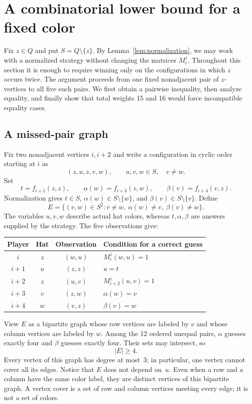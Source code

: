 \section{A combinatorial lower bound for a fixed color}\label{sec:local}
Fix $z\in Q$ and put $S=Q\setminus\{z\}$. By
Lemma~\ref{lem:normalization}, we may work with a normalized strategy
without changing the matrices $M_i^z$. Throughout this section it is enough
to require winning only on the configurations in which $z$ occurs twice.
The argument proceeds from one fixed nonadjacent pair of $z$-vertices
to all five such pairs. We first obtain a pairwise inequality, then
analyze equality, and finally show that total weights 15 and 16 would
force incompatible equality cases.

\subsection{A missed-pair graph}
Fix two nonadjacent vertices $i,i+2$ and write a configuration in cyclic
order starting at $i$ as
\begin{equation}\label{eq:two-z}
(z,u,z,v,w),\qquad u,v,w\in S,\quad v\ne w.
\end{equation}
Set
\[
t=f_{i+1}(z,z),\qquad
\alpha(w)=f_{i+3}(z,w),\qquad
\beta(v)=f_{i+4}(v,z).
\]
Normalization gives $t\in S$, $\alpha(w)\in S\setminus\{w\}$, and
$\beta(v)\in S\setminus\{v\}$. Define
\begin{equation}\label{eq:missed}
E=\{(v,w)\in S^2:v\ne w,\ \alpha(w)\ne v,\ \beta(v)\ne w\}.
\end{equation}
The variables $u,v,w$ describe actual hat colors, whereas $t,\alpha,\beta$
are answers supplied by the strategy. The five observations give:
\begin{center}\small
\begin{tabular}{@{}cccl@{}}
\toprule
Player&Hat&Observation&Condition for a correct guess\\
\midrule
$i$&$z$&$(w,u)$&$M_i^z(w,u)=1$\\
$i+1$&$u$&$(z,z)$&$u=t$\\
$i+2$&$z$&$(u,v)$&$M_{i+2}^z(u,v)=1$\\
$i+3$&$v$&$(z,w)$&$\alpha(w)=v$\\
$i+4$&$w$&$(v,z)$&$\beta(v)=w$\\
\bottomrule
\end{tabular}
\end{center}
View $E$ as a bipartite graph whose row vertices are labeled by $v$ and whose
column vertices are labeled by $w$. Among the 12 ordered unequal pairs,
$\alpha$ guesses exactly four and $\beta$ guesses exactly four. Their sets
may intersect, so
\begin{equation}\label{eq:missed-size}
|E|\geq4.
\end{equation}
Every vertex of this graph has degree at most~3; in particular, one vertex
cannot cover all its edges. Notice that $E$ does not depend on~$u$.
Even when a row and a column have the same color label, they are distinct
vertices of this bipartite graph. A vertex cover is a set of row and
column vertices meeting every edge; it is not a set of colors.

